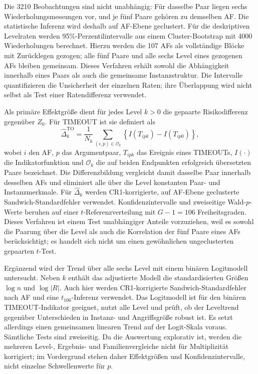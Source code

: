 Die 3210 Beobachtungen sind nicht unabhängig: Für dasselbe Paar liegen sechs
Wiederholungsmessungen vor, und je fünf Paare gehören zu demselben AF. Die
statistische Inferenz wird deshalb auf AF-Ebene geclustert. Für die
deskriptiven Levelraten werden 95\%-Perzentilintervalle aus einem
Cluster-Bootstrap mit 4000 Wiederholungen berechnet. Hierzu werden die 107
AFs als vollständige Blöcke mit Zurücklegen gezogen; alle fünf Paare und alle
sechs Level eines gezogenen AFs bleiben gemeinsam. Dieses Verfahren erhält
sowohl die Abhängigkeit innerhalb eines Paars als auch die gemeinsame
Instanzstruktur. Die Intervalle quantifizieren die Unsicherheit der
einzelnen Raten; ihre Überlappung wird nicht selbst als Test einer
Ratendifferenz verwendet.

Als primäre Effektgröße dient für jedes Level \(k>0\) die gepaarte
Risikodifferenz gegenüber \(Z_0\). Für TIMEOUT ist sie definiert als
\begin{equation}
    \widehat{\Delta}^{\mathrm{TO}}_k
    = \frac{1}{N_k}\sum_{(i,p)\in\mathcal O_k}
      \left\{
        I(T_{ipk})-I(T_{ip0})
      \right\},
    \label{eq:empirical-stable-timeout-rd}
\end{equation}
wobei \(i\) den AF, \(p\) das Argumentpaar, \(T_{ipk}\) das Ereignis eines
TIMEOUTs, \(I(\cdot)\) die Indikatorfunktion und \(\mathcal O_k\) die auf
beiden Endpunkten erfolgreich übersetzten Paare bezeichnet. Die
Differenzbildung vergleicht damit dasselbe Paar innerhalb
desselben AFs und eliminiert alle über die Level konstanten Paar- und
Instanzmerkmale. Für \(\widehat{\Delta}_k\) werden CR1-korrigierte, auf
AF-Ebene geclusterte Sandwich-Standardfehler verwendet. Konfidenzintervalle
und zweiseitige Wald-\(p\)-Werte beruhen auf einer
\(t\)-Referenzverteilung mit \(G-1=106\) Freiheitsgraden. Dieses Verfahren
ist einem Test unabhängiger Anteile vorzuziehen, weil es sowohl die Paarung
über die Level als auch die Korrelation der fünf Paare eines AFs
berücksichtigt; es handelt sich nicht um einen gewöhnlichen ungeclusterten
gepaarten \(t\)-Test.

Ergänzend wird der Trend über alle sechs Level mit einem binären
Logitmodell untersucht. Neben \(k\) enthält das adjustierte Modell die
standardisierten Größen \(\log n\) und \(\log |R|\). Auch hier werden
CR1-korrigierte Sandwich-Standardfehler nach AF und eine
\(t_{106}\)-Inferenz verwendet.
Das Logitmodell ist für den binären TIMEOUT-Indikator geeignet, nutzt alle
Level und prüft, ob der Leveltrend gegenüber Unterschieden in Instanz- und
Angriffsgröße robust ist. Es setzt allerdings einen gemeinsamen linearen
Trend auf der Logit-Skala voraus. Sämtliche Tests sind zweiseitig. Da die
Auswertung explorativ ist, werden die mehreren Level-, Ergebnis- und
Familienvergleiche nicht für Multiplizität korrigiert; im Vordergrund stehen
daher Effektgrößen und Konfidenzintervalle, nicht einzelne Schwellenwerte
für \(p\).

